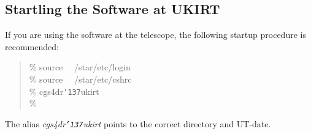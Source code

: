 \documentclass[a4paper]{book}
\renewcommand{\_}{{\tt\char'137}}
\begin{document}
\subsection{Startling the Software at UKIRT}
If you are using the software at the telescope, the following startup procedure is
recommended:

\begin{minipage}{120mm}
\begin{quote}
  \%  source \ \ /star/etc/login \\
  \%  source \ \ /star/etc/cshrc \\
  \%  cgs4dr\_ukirt \\
  \%
\end{quote}
\end{minipage}

The alias {\it cgs4dr\_ukirt} points to the correct directory and UT-date.
\end{document}
